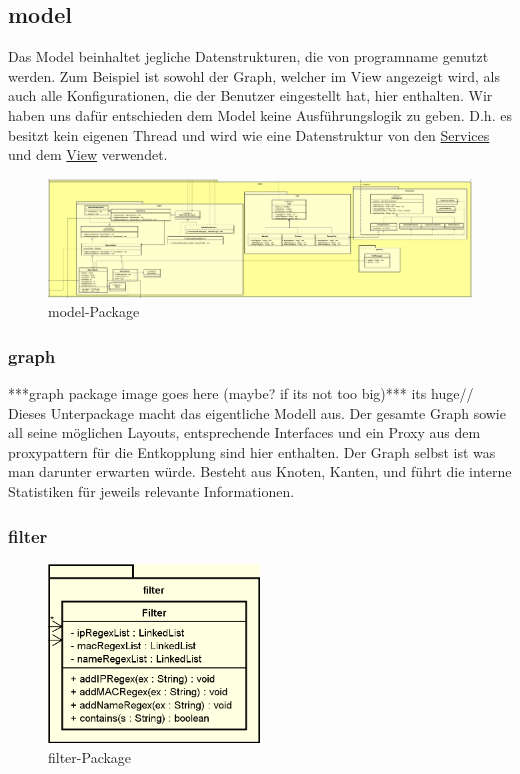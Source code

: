 \subsection{model}
\label{subsec:model}

Das Model beinhaltet jegliche Datenstrukturen, die von \gls{programname} genutzt
werden. Zum Beispiel ist sowohl der Graph, welcher im View angezeigt wird, 
als auch alle Konfigurationen, die der Benutzer eingestellt hat, hier enthalten. Wir haben uns 
dafür entschieden dem Model keine Ausführungslogik zu geben.
D.h. es besitzt kein eigenen Thread und wird wie eine Datenstruktur von den
\hyperref[subsec:service]{Services} und dem \hyperref[subsec:view]{View} verwendet.

\begin{figure}[H]
  \centering
  \includegraphics[width=\textwidth]{../diagramimages/model.png}
  \caption{model-Package}
\end{figure}

    \subsubsection{graph}
    \label{subsubsec:graph}
    ***graph package image goes here (maybe? if its not too big)*** its huge//
    \newline
    \newline
    Dieses Unterpackage macht das eigentliche Modell aus. Der gesamte Graph sowie
    all seine möglichen Layouts, entsprechende Interfaces und ein Proxy aus dem
    \gls{proxypattern} für die Entkopplung sind hier enthalten. Der Graph selbst ist was man darunter erwarten würde.
    Besteht aus Knoten, Kanten, und führt die interne Statistiken für jeweils relevante Informationen.

    \subsubsection{filter}
    \label{subsubsec:filter}
    
    \begin{figure}[H]
      \centering
      \includegraphics[width=0.5\textwidth]{../diagramimages/filter.png}
      \caption{filter-Package}
    \end{figure}
    
